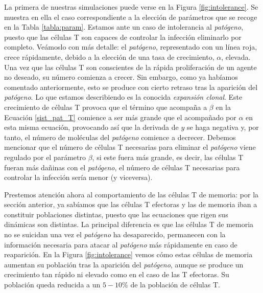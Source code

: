 La primera de nuestras simulaciones puede verse en la Figura \ref{fig:intolerance}. Se muestra en ella el caso correspondiente a la elección de parámetros que se recoge en la Tabla \ref{tabla:param}. Estamos ante un caso de intolerancia al \textit{patógeno}, puesto que las células T son capaces de controlar la infección eliminarlo por completo. Veámoslo con más detalle: el \textit{patógeno}, representado con un línea roja, crece rápidamente, debido a la elección de una tasa de crecimiento, $\alpha$, elevada. Una vez que las células T son conscientes de la rápida proliferación de un agente no deseado, su número comienza a crecer. Sin embargo, como ya habíamos comentado anteriormente, esto se produce con cierto retraso tras la aparición del \textit{patógeno}. Lo que estamos describiendo es la conocida \textit{expansión clonal}. Este crecimiento de células T provoca que el término que acompaña a $\beta$ en la Ecuación \ref{sist_pat_T} comience a ser más grande que el acompañado por $\alpha$ en esta misma ecuación, provocando así que la derivada de $y$ se haga negativa y, por tanto, el número de moléculas del \textit{patógeno} comience a decrecer. Debemos mencionar que el número de células T necesarias para eliminar el \textit{patógeno} viene regulado por el parámetro $\beta$, si este fuera más grande, es decir, las células T fueran más dañinas con el \textit{patógeno}, el número de células T necesarias para controlar la infección sería menor (y viceversa).


Prestemos atención ahora al comportamiento de las células T de memoria: por la sección anterior, ya sabíamos que las células T efectoras y las de memoria iban a constituir poblaciones distintas, puesto que las ecuaciones que rigen sus dinámicas son distintas. La principal diferencia es que las células T de memoria no se suicidan una vez el \textit{patógeno} ha desaparecido, permanecen con la información necesaria para atacar al \textit{patógeno} más rápidamente en caso de reaparición. En la Figura \ref{fig:intolerance} vemos cómo estas células de memoria aumentan su población tras la aparición del \textit{patógeno}, aunque se produce un crecimiento tan rápido ni elevado como en el caso de las T efectoras. Su población queda reducida a un $5-10\%$ de la población de células T.


